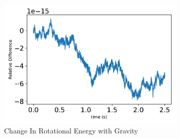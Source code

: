 \begin{figure}[htbp]\centerline{\includegraphics[width=0.8\textwidth]{AutoTeX/ChangeInRotationalEnergyGravity}}\caption{Change In Rotational Energy with Gravity}\label{fig:ChangeInRotationalEnergyGravity}\end{figure}